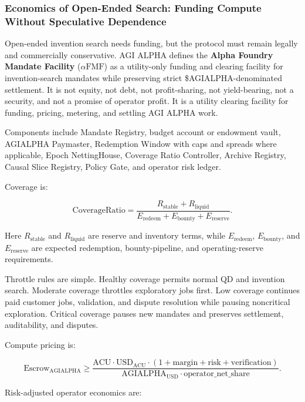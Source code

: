 \subsubsection{Economics of Open-Ended Search: Funding Compute Without
Speculative
Dependence}\label{economics-of-open-ended-search-funding-compute-without-speculative-dependence}

Open-ended invention search needs funding, but the protocol must remain
legally and commercially conservative. AGI ALPHA defines the
\textbf{Alpha Foundry Mandate Facility} (\(\alpha\mathrm{FMF}\)) as a
utility-only funding and clearing facility for invention-search mandates
while preserving strict \$AGIALPHA-denominated settlement. It is not
equity, not debt, not profit-sharing, not yield-bearing, not a security,
and not a promise of operator profit. It is a utility clearing facility
for funding, pricing, metering, and settling AGI ALPHA work.

Components include Mandate Registry, budget account or endowment vault,
AGIALPHA Paymaster, Redemption Window with caps and spreads where
applicable, Epoch NettingHouse, Coverage Ratio Controller, Archive
Registry, Causal Slice Registry, Policy Gate, and operator risk ledger.

Coverage is:

\[
\mathrm{CoverageRatio}
=
\frac{R_{\mathrm{stable}}+R_{\mathrm{liquid}}}
{E_{\mathrm{redeem}}+E_{\mathrm{bounty}}+E_{\mathrm{reserve}}}.
\]

Here \(R_{\mathrm{stable}}\) and \(R_{\mathrm{liquid}}\) are reserve and
inventory terms, while \(E_{\mathrm{redeem}}\), \(E_{\mathrm{bounty}}\),
and \(E_{\mathrm{reserve}}\) are expected redemption, bounty-pipeline,
and operating-reserve requirements.

Throttle rules are simple. Healthy coverage permits normal QD and
invention search. Moderate coverage throttles exploratory jobs first.
Low coverage continues paid customer jobs, validation, and dispute
resolution while pausing noncritical exploration. Critical coverage
pauses new mandates and preserves settlement, auditability, and
disputes.

Compute pricing is:

\[
\mathrm{Escrow}_{\mathrm{AGIALPHA}}
\ge
\frac{
\mathrm{ACU}\cdot \mathrm{USD}_{\mathrm{ACU}}\cdot
(1+\mathrm{margin}+\mathrm{risk}+\mathrm{verification})
}{
\mathrm{AGIALPHA}_{\mathrm{USD}}\cdot
\mathrm{operator\_net\_share}
}.
\]

Risk-adjusted operator economics are:

